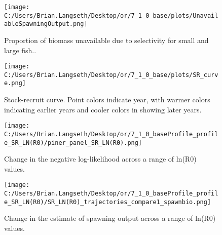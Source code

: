 \documentclass[11pt,
  english,
  a4paper,
]{article}
\begin{document}
\begin{figure}
\centering
\texttt{[image: C:/Users/Brian.Langseth/Desktop/or/7\_1\_0\_base/plots/UnavailableSpawningOutput.png]}
\caption{Proportion of biomass unavailable due to selectivity for small and large fish..\label{fig:unavail-bio}}
\end{figure}

\tagmcend\tagstructend


\begin{figure}
\centering
\texttt{[image: C:/Users/Brian.Langseth/Desktop/or/7\_1\_0\_base/plots/SR\_curve.png]}
\caption{Stock-recruit curve. Point colors indicate year, with warmer colors indicating earlier years and cooler colors in showing later years.\label{fig:bh-curve}}
\end{figure}

\tagmcend\tagstructend


\begin{figure}
\centering
\texttt{[image: C:/Users/Brian.Langseth/Desktop/or/7\_1\_0\_baseProfile\_profile\_SR\_LN(R0)/piner\_panel\_SR\_LN(R0).png]}
\caption{Change in the negative log-likelihood across a range of ln(R0) values.\label{fig:r0-profile}}
\end{figure}

\tagmcend\tagstructend


\begin{figure}
\centering
\texttt{[image: C:/Users/Brian.Langseth/Desktop/or/7\_1\_0\_baseProfile\_profile\_SR\_LN(R0)/SR\_LN(R0)\_trajectories\_compare1\_spawnbio.png]}
\caption{Change in the estimate of spawning output across a range of ln(R0) values.\label{fig:r0-ssb}}
\end{figure}

\tagmcend\tagstructend

\end{document}
